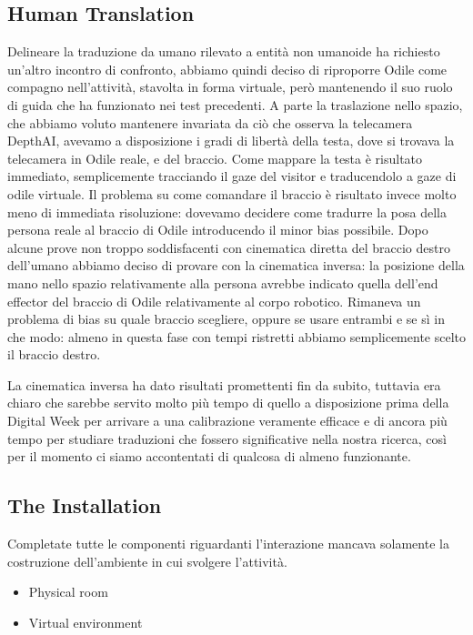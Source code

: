 \documentclass{Configuration_Files/PoliMi3i_thesis}
\begin{document}
\subsection{Human Translation}

Delineare la traduzione da umano rilevato a entità non umanoide ha richiesto un’altro incontro di confronto, abbiamo quindi deciso di riproporre Odile come compagno nell’attività, stavolta in forma virtuale, però mantenendo il suo ruolo di guida che ha funzionato nei test precedenti. A parte la traslazione nello spazio, che abbiamo voluto mantenere invariata da ciò che osserva la telecamera DepthAI, avevamo a disposizione i gradi di libertà della testa, dove si trovava la telecamera in Odile reale, e del braccio. Come mappare la testa è risultato immediato, semplicemente tracciando il gaze del visitor e traducendolo a gaze di odile virtuale. Il problema su come comandare il braccio è risultato invece molto meno di immediata risoluzione: dovevamo decidere come tradurre la posa della persona reale al braccio di Odile introducendo il minor bias possibile. Dopo alcune prove non troppo soddisfacenti con cinematica diretta del braccio destro dell’umano abbiamo deciso di provare con la cinematica inversa: la posizione della mano nello spazio relativamente alla persona avrebbe indicato quella dell’end effector del braccio di Odile relativamente al corpo robotico. Rimaneva un problema di bias su quale braccio scegliere, oppure se usare entrambi e se sì in che modo: almeno in questa fase con tempi ristretti abbiamo semplicemente scelto il braccio destro.

La cinematica inversa ha dato risultati promettenti fin da subito, tuttavia era chiaro che sarebbe servito molto più tempo di quello a disposizione prima della Digital Week per arrivare a una calibrazione veramente efficace e di ancora più tempo per studiare traduzioni che fossero significative nella nostra ricerca, così per il momento ci siamo accontentati di qualcosa di almeno funzionante.

\subsection{The Installation}

Completate tutte le componenti riguardanti l’interazione mancava solamente la costruzione dell’ambiente in cui svolgere l’attività. 

\begin{itemize}
    \item Physical room
    \item Virtual environment
\end{itemize}
\end{document}
